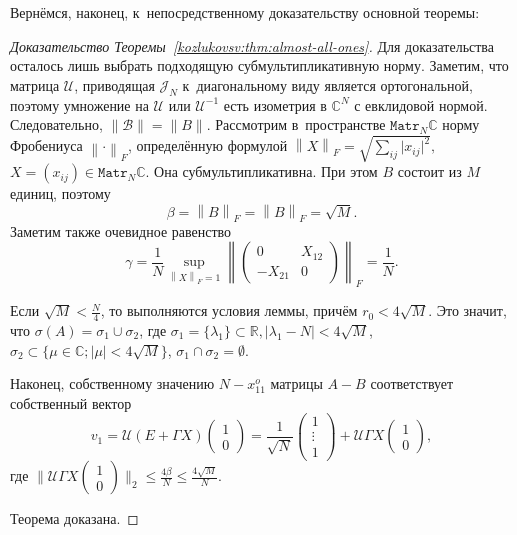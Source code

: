 Верн\"емся, наконец, к~непосредственному доказательству основной теоремы:
\begin{proof}[Доказательство Теоремы~\ref{kozlukovsv:thm:almost-all-ones}]
    Для доказательства осталось лишь выбрать подходящую субмультипликативную норму.
    Заметим, что матрица \( \mathcal{U} \),
    приводящая \( \mathcal{J}_N \) к~диагональному виду
    является ортогональной,
    поэтому умножение на \( \mathcal{U} \) или \(\mathcal{U}^{-1}\)
    есть изометрия в \( \mathbb{C}^N \) с евклидовой нормой.
    Следовательно, \( \|\mathcal{B}\|=\|B\| \).
    Рассмотрим в~пространстве \( \mathtt{Matr}_{N}\mathbb{C} \)
    норму Фробениуса \( {\left\|\cdot\right\|}_{F} \),
    определ\"енную формулой
    \( {\left\|X\right\|}_{F} = \sqrt{\sum_{ij} \lvert x_{ij}\rvert^2}, \)
    \( X = (x_{ij})\in\mathtt{Matr}_N\mathbb{C} \).
    Она субмультипликативна.
    При этом
    \( B \) состоит из \( M \) единиц, поэтому
    \[
        \beta = {\left\|B\right\|}_{F} =
        {\left\|B\right\|}_{F} = \sqrt{M}.
        \]
    Заметим также очевидное равенство
    \[
        \gamma = \frac1N
                \sup_{{\left\|X\right\|}_{F}=1}{\left\|\begin{pmatrix}0 & X_{12} \\ -X_{21} & 0\end{pmatrix}\right\|}_{F}
                = \frac1N. \]
    
    Если
     \( \sqrt{M} < \frac{N}{4} \),
     то выполняются условия леммы,
     прич\"ем \( r_0 < 4\sqrt{M} \).
    Это значит, что
     \( \sigma(A) = \sigma_1 \cup \sigma_2 \),
     где \( \sigma_1 = \{ \lambda_1 \}\subset\mathbb{R}, \lvert \lambda_1 - N \rvert < 4\sqrt{M} \),
     \( \sigma_2 \subset \{ \mu\in\mathbb{C}; \lvert\mu\rvert < 4\sqrt{M} \} \),
     \( \sigma_1 \cap \sigma_2 = \emptyset \).

     Наконец, собственному значению \( N - x_{11}^o \)
     матрицы \( A-B \)
     соответствует собственный вектор
     \[
         v_1 = \mathcal{U}(E+\Gamma X) \begin{pmatrix}1\\0\end{pmatrix}
             = \frac{1}{\sqrt{N}} \begin{pmatrix}1\\ \vdots \\ 1\end{pmatrix}
                 + \mathcal{U}\Gamma X \begin{pmatrix}1\\0\end{pmatrix}, \]
     где \( \|\mathcal{U}\Gamma X \begin{pmatrix}1\\0\end{pmatrix}\|_2 \leq \frac{4\beta}{N} \leq \frac{4\sqrt{M}}{N} \).

    
    Теорема доказана.
    \end{proof}
